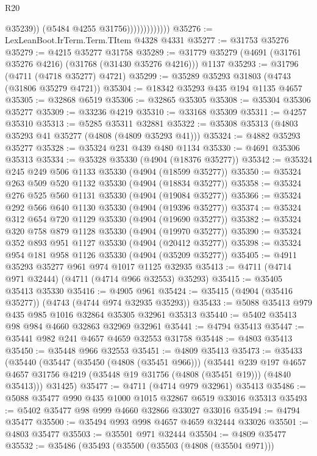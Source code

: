 \begin{lexlean}{R20}
\begin{coremodule}
                                @35239))
                            (@5484 @4255 @31756)))))))))))))
@35276 := LexLeanBoot.IrTerm.Term.TItem @4328 @4331
@35277 := @31753 @35276
@35279 := @4215 @35277 @31758
@35289 := @31779 @35279 (@4691 (@31761 @35276 @4216) (@31768 (@31430 @35276 @4216))) @1137
@35293 := @31796 (@4711 (@4718 @35277) @4721)
@35299 := @35289 @35293 @31803 (@4743 (@31806 @35279 @4721))
@35304 := @18342 @35293 @435 @194 @1135 @4657
@35305 := @32868 @6519
@35306 := @32865 @35305
@35308 := @35304 @35306 @35277
@35309 := @33236 @4219
@35310 := @33168 @35309
@35311 := @4257 @35310
@35313 := @5285 @35311 @32881
@35322 := @35308 @35313 (@4803 @35293 @41 @35277 (@4808 (@4809 @35293 @41)))
@35324 := @4882 @35293 @35277
@35328 := @35324 @231 @439 @480 @1134
@35330 := @4691 @35306 @35313
@35334 := @35328 @35330 (@4904 (@18376 @35277))
@35342 := @35324 @245 @249 @506 @1133 @35330 (@4904 (@18599 @35277))
@35350 := @35324 @263 @509 @520 @1132 @35330 (@4904 (@18834 @35277))
@35358 := @35324 @276 @525 @560 @1131 @35330 (@4904 (@19084 @35277))
@35366 := @35324 @292 @566 @640 @1130 @35330 (@4904 (@19396 @35277))
@35374 := @35324 @312 @654 @720 @1129 @35330 (@4904 (@19690 @35277))
@35382 := @35324 @320 @758 @879 @1128 @35330 (@4904 (@19970 @35277))
@35390 := @35324 @352 @893 @951 @1127 @35330 (@4904 (@20412 @35277))
@35398 := @35324 @954 @181 @958 @1126 @35330 (@4904 (@35209 @35277))
@35405 := @4911 @35293 @35277 @961 @974 @1017 @1125 @32935
@35413 := @4711 (@4714 @971 @32444) (@4711 (@4714 @966 @32553) @35293)
@35415 := @35405 @35413 @35330
@35416 := @4905 @961
@35424 := @35415 (@4904 (@35416 @35277)) (@4743 (@4744 @974 @32935 @35293))
@35433 := @5088 @35413 @979 @435 @985 @1016 @32864 @35305 @32961 @35313
@35440 := @5402 @35413 @98 @984 @4660 @32863 @32969 @32961
@35441 := @4794 @35413
@35447 := @35441 @982 @241 @4657 @4659 @32553 @31758
@35448 := @4803 @35413
@35450 := @35448 @966 @32553
@35451 := @4809 @35413
@35473 := @35433
    (@35440
      (@35447
        (@35450 (@4808 (@35451 @966)))
        (@35441
          @239
          @197
          @4657
          @4657
          @31756
          @4219
          (@35448 @19 @31756 (@4808 (@35451 @19)))
          (@4840 @35413)))
      @31425)
@35477 := @4711 (@4714 @979 @32961) @35413
@35486 := @5088 @35477 @990 @435 @1000 @1015 @32867 @6519 @33016 @35313
@35493 := @5402 @35477 @98 @999 @4660 @32866 @33027 @33016
@35494 := @4794 @35477
@35500 := @35494 @993 @998 @4657 @4659 @32444 @33026
@35501 := @4803 @35477
@35503 := @35501 @971 @32444
@35504 := @4809 @35477
@35532 := @35486
    (@35493
      (@35500
        (@35503 (@4808 (@35504 @971)))

\end{coremodule}
\end{lexlean}
